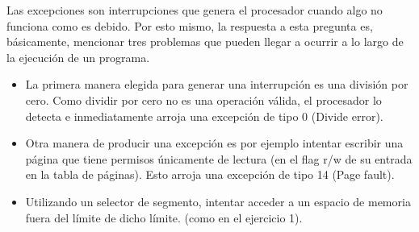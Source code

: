 Las excepciones son interrupciones que genera el procesador cuando algo no funciona como es debido. Por esto mismo, la respuesta a esta pregunta es, básicamente, mencionar tres problemas que pueden llegar a ocurrir a lo largo de la ejecución de un programa.

\begin{itemize}
	\item La primera manera elegida para generar una interrupción es una división por cero. Como dividir por cero no es una operación válida, el procesador lo detecta e inmediatamente arroja una excepción de tipo 0 (Divide error).
		
	\item Otra manera de producir una excepción es por ejemplo intentar escribir una página que tiene permisos únicamente de lectura (en el flag r/w de su entrada en la tabla de páginas). Esto arroja una excepción de tipo 14 (Page fault).

	\item Utilizando un selector de segmento, intentar acceder a un espacio de memoria fuera del límite de dicho límite. (como en el ejercicio 1).

\end{itemize}